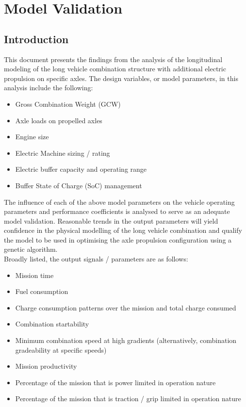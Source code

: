 \documentclass[ExampleMasters.tex]{subfiles}
\begin{document}


\chapter{Model Validation}

\section{Introduction}
This document presents the findings from the analysis of the longitudinal modeling of the long vehicle combination structure with additional electric propulsion on specific axles. The design variables, or model parameters, in this analysis include the following:

\begin{itemize} 
\item Gross Combination Weight (GCW)
\item Axle loads on propelled axles
\item Engine size
\item Electric Machine sizing / rating
\item Electric buffer capacity and operating range
\item Buffer State of Charge (SoC) management
\end{itemize}

The influence of each of the above model parameters on the vehicle operating parameters and performance coefficients is analysed to serve as an adequate model validation. Reasonable trends in the output parameters will yield confidence in the physical modelling of the long vehicle combination and qualify the model to be used in optimising the axle propulsion configuration using a genetic algorithm.\\

Broadly listed, the output signals / parameters are as follows:

\begin{itemize}
\item Mission time
\item Fuel consumption
\item Charge consumption patterns over the mission and total charge consumed
\item Combination startability
\item Minimum combination speed at high gradients (alternatively, combination gradeability at specific speeds)
\item Mission productivity
\item Percentage of the mission that is power limited in operation nature
\item Percentage of the mission that is traction / grip limited in operation nature
\end{itemize}
\end{document}
